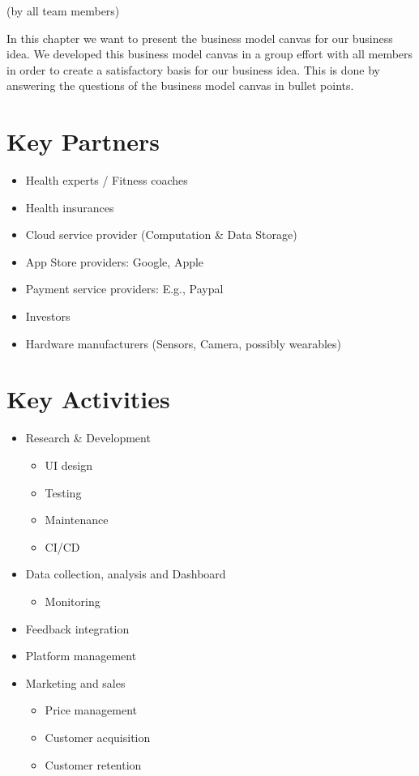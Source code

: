 (by all team members)

\p
In this chapter we want to present the business model canvas for our business idea.
We developed this business model canvas in a group effort with all members in order to create a satisfactory basis for our business idea.
This is done by answering the questions of the business model canvas in bullet points.

\section{Key Partners}
\begin{itemize}
    \item Health experts / Fitness coaches
    \item Health insurances
    \item Cloud service provider (Computation \& Data Storage)
    \item App Store providers: Google, Apple
    \item Payment service providers: E.g., Paypal
    \item Investors
    \item Hardware manufacturers (Sensors, Camera, possibly wearables)
\end{itemize}

\section{Key Activities}
\begin{itemize}
    \item Research \& Development
        \begin{itemize}
            \item UI design
            \item Testing
            \item Maintenance
            \item CI/CD
        \end{itemize}
    \item Data collection, analysis and Dashboard
        \begin{itemize}
            \item Monitoring
        \end{itemize}
    \item Feedback integration
    \item Platform management
    \item Marketing and sales
        \begin{itemize}
            \item Price management
            \item Customer acquisition
            \item Customer retention
        \end{itemize}
\end{itemize}

